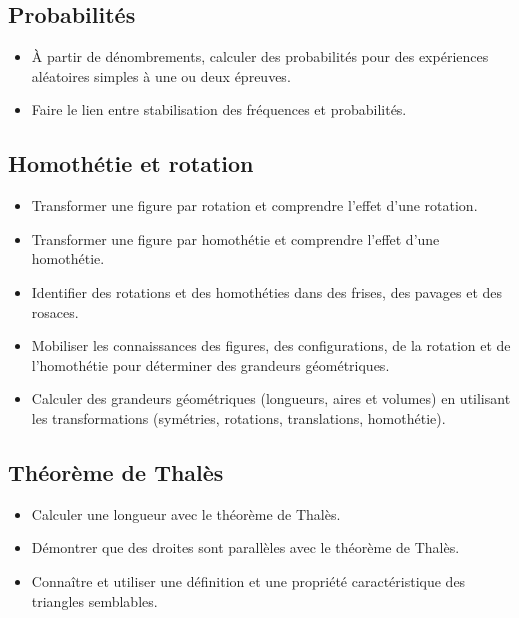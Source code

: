\documentclass[a4paper,12pt,fleqn]{article}
\begin{document}
\subsection*{Probabilités}

\begin{itemize}
	\item {}À partir de dénombrements, calculer des probabilités pour des expériences aléatoires simples à une ou deux épreuves.
	\item {}Faire le lien entre stabilisation des fréquences et probabilités.
\end{itemize}



\subsection*{Homothétie et rotation}

\begin{itemize}
	\item {}Transformer une figure par rotation et comprendre l’effet d’une rotation.
	\item {}Transformer une figure par homothétie et comprendre l’effet d’une homothétie.
	\item {}Identifier des rotations et des homothéties dans des frises, des pavages et des rosaces.
	\item {}Mobiliser les connaissances des figures, des configurations, de la rotation et de l’homothétie pour déterminer des grandeurs géométriques.
	\item {}Calculer des grandeurs géométriques (longueurs, aires et volumes) en utilisant les transformations (symétries, rotations, translations, homothétie).
	

\end{itemize}

\subsection*{Théorème de Thalès}

\begin{itemize}
	\item {}Calculer une longueur avec le théorème de Thalès.
	\item {}Démontrer que des droites sont parallèles avec le théorème de Thalès.
	\item {}Connaître et utiliser une définition et une propriété caractéristique des triangles semblables.
\end{itemize}
\end{document}

